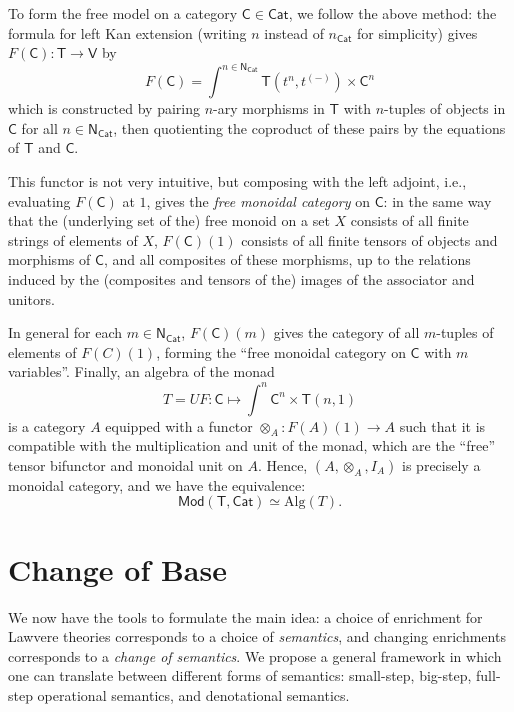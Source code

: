 \documentclass{amsart}
\theoremstyle{definition}
\newcommand{\Cat}{\mathsf{Cat}}
\newcommand{\Mod}{\mathsf{Mod}}
\newcommand{\NN}{\mathsf{N}}
\newcommand{\V}{\mathsf{V}}
\newcommand{\C}{\mathsf{C}}
\newcommand{\T}{\mathsf{T}}
\newcommand{\maps}{\colon}
\begin{document}
To form the free model on a category $\C\in \Cat$, we follow the above method: the formula for left Kan extension (writing $n$ instead of $n_\Cat$ for simplicity) gives $F(\C)\maps \T\to \V$ by 
\[   F(\C) = \int^{n\in \NN_\Cat} \T(t^{n},t^{(-)})\times \C^{n} \] 
which is constructed by pairing $n$-ary morphisms in $\T$ with $n$-tuples of objects in $\C$ for all $n\in \NN_\Cat$, then quotienting the coproduct of these pairs by the equations of $\T$ and $\C$.

This functor is not very intuitive, but composing with the left adjoint, i.e., evaluating $F(\C)$ at $1$, gives the \textit{free monoidal category} on $\C$: in the same way that the (underlying set of the) free monoid on a set $X$ consists of all finite strings of elements of $X$, $F(\C)(1)$ consists of all finite tensors of objects and morphisms of $\C$, and all composites of these morphisms, up to the relations induced by the (composites and tensors of the) images of the associator and unitors.

In general for each $m\in \NN_\Cat$, $F(\C)(m)$ gives the category of all $m$-tuples of elements of $F(C)(1)$, forming the ``free monoidal category on $\C$ with $m$ variables''.  Finally, an algebra of the monad 
\[  T = UF \maps \C \mapsto \int^n \C^n \times \T(n,1) \]
is a category $A$ equipped with a functor $\otimes_A\maps F(A)(1)\to A$ such that it is compatible with the multiplication and unit of the monad, which are the ``free'' tensor bifunctor and monoidal unit on $A$. Hence, $(A,\otimes_A,I_A)$ is precisely a monoidal category, and we have the equivalence: 
\[ \Mod(\T,\Cat) \simeq \mathrm{Alg}(T). \]

\section{Change of Base}

We now have the tools to formulate the main idea: a choice of enrichment for Lawvere theories corresponds to a choice of \textit{semantics}, and changing enrichments corresponds to a \textit{change of semantics}. We propose a general framework in which one can translate between different forms of semantics: small-step, big-step, full-step operational semantics, and denotational semantics.
\end{document}
